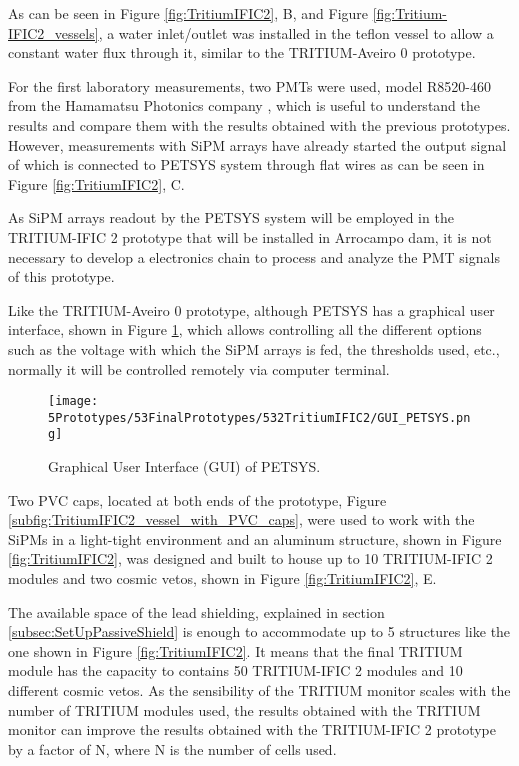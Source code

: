 As can be seen in Figure \ref{fig:TritiumIFIC2}, B, and Figure \ref{fig:Tritium-IFIC2_vessels}, a water inlet/outlet was installed in the teflon vessel to allow a constant water flux through it, similar to the TRITIUM-Aveiro 0 prototype.

For the first laboratory measurements, two PMTs were used, model R8520-460 from the Hamamatsu Photonics company \cite{DataSheetPMTs}, which is useful to understand the results and compare them with the results obtained with the previous prototypes. However, measurements with SiPM arrays have already started the output signal of which is connected to PETSYS system through flat wires as can be seen in Figure \ref{fig:TritiumIFIC2}, C.

As SiPM arrays readout by the PETSYS system will be employed in the TRITIUM-IFIC 2 prototype that will be installed in Arrocampo dam, it is not necessary to develop a electronics chain to process and analyze the PMT signals of this prototype.

Like the TRITIUM-Aveiro 0 prototype, although PETSYS has a graphical user interface, shown in Figure \ref{fig:GUI_PETSYS}, which allows controlling all the different options such as the voltage with which the SiPM arrays is fed, the thresholds used, etc., normally it will be controlled remotely via computer terminal. 

\begin{figure}[h]
\centering
\texttt{[image: 5Prototypes/53FinalPrototypes/532TritiumIFIC2/GUI\_PETSYS.png]}
\caption{Graphical User Interface (GUI) of PETSYS.\label{fig:GUI_PETSYS}}
\end{figure}

Two PVC caps, located at both ends of the prototype, Figure \ref{subfig:TritiumIFIC2_vessel_with_PVC_caps}, were used to work with the SiPMs in a light-tight environment and an aluminum structure, shown in Figure \ref{fig:TritiumIFIC2}, was designed and built to house up to 10 TRITIUM-IFIC 2 modules and two cosmic vetos, shown in Figure \ref{fig:TritiumIFIC2}, E.

The available space of the lead shielding, explained in section \ref{subsec:SetUpPassiveShield} is enough to accommodate up to 5 structures like the one shown in Figure \ref{fig:TritiumIFIC2}. It means that the final TRITIUM module has the capacity to contains 50 TRITIUM-IFIC 2 modules and 10 different cosmic vetos. As the sensibility of the TRITIUM monitor scales with the number of TRITIUM modules used, the results obtained with the TRITIUM monitor can improve the results obtained with the TRITIUM-IFIC 2 prototype by a factor of N, where N is the number of cells used.

